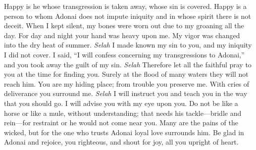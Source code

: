 \begin{biblechapter} %
 Happy is he whose transgression is taken away, 
whose sin is covered.
\verse Happy is a person to whom Adonai does not impute iniquity 
and in whose spirit there is not deceit.
\verse When I kept silent, my bones were worn out 
due to my groaning all the day.
\verse For day and night your hand was heavy upon me. 
My vigor was changed into the dry heat of summer. \textit{Selah}
\verse I made known my sin to you, and my iniquity I did not cover. 
I said, “I will confess concerning my transgressions to Adonai,” 
and you took away the guilt of my sin. \textit{Selah}
\verse Therefore let all the faithful pray to you 
at the time for finding you. 
Surely at the flood of many waters they will not reach him.
\verse You are my hiding place; 
from trouble you preserve me. 
With cries of deliverance you surround me. \textit{Selah}
\verse I will instruct you and teach you 
in the way that you should go. 
I will advise you with my eye upon you.
\verse Do not be like a horse or like a mule, without understanding; 
that needs his tackle—bridle and rein—for restraint 
or he would not come near you.
\verse Many are the pains of the wicked, 
but for the one who trusts Adonai 
loyal love surrounds him.
\verse Be glad in Adonai and rejoice, you righteous, 
and shout for joy, all you upright of heart.
\end{biblechapter}

